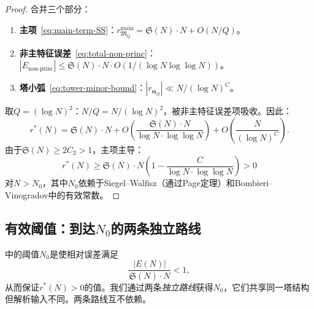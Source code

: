 \documentclass[11pt,a4paper]{article}
\theoremstyle{remark}
\newcommand{\mM}{\mathfrak{M}}
\newcommand{\mm}{\mathfrak{m}}
\begin{document}
\begin{proof}
合并三个部分：
\begin{enumerate}[nosep]
  \item \textbf{主项}~\eqref{eq:main-term-SS}：$r_{\mM_Q}^{\text{main}} = \mathfrak{S}(N)\cdot N + O(N/Q)$。
  \item \textbf{非主特征误差}~\eqref{eq:total-non-princ}：$|E_{\text{non-princ}}| \leq \mathfrak{S}(N)\cdot N \cdot O(1/(\log N\log\log N))$。
  \item \textbf{塔小弧}~\eqref{eq:tower-minor-bound}：$|r_{\mm_Q}| \ll N/(\log N)^C$。
\end{enumerate}

取$Q = (\log N)^2$：$N/Q = N/(\log N)^2$，被非主特征误差项吸收。因此：
\begin{equation}
  r^*(N) = \mathfrak{S}(N)\cdot N + O\!\left(\frac{\mathfrak{S}(N)\cdot N}{\log N\cdot\log\log N}\right)
    + O\!\left(\frac{N}{(\log N)^C}\right).
\end{equation}
由于$\mathfrak{S}(N) \geq 2C_2 > 1$，主项主导：
\begin{equation}
  r^*(N) \geq \mathfrak{S}(N)\cdot N\left(1 - \frac{C}{\log N\cdot\log\log N}\right) > 0
\end{equation}
对$N > N_0$，其中$N_0$依赖于Siegel--Walfisz（通过Page定理）和Bombieri--Vinogradov中的有效常数。
\end{proof}

\subsection{有效阈值：到达$N_0$的两条独立路线}
\label{subsec:threshold}

中的阈值$N_0$是使相对误差满足
\begin{equation}
\label{eq:N0-def}
  \frac{|E(N)|}{\mathfrak{S}(N)\cdot N} < 1,
\end{equation}
从而保证$r^*(N) > 0$的值。我们通过两条\emph{独立路线}获得$N_0$，它们共享同一塔结构但解析输入不同。两条路线互不依赖。
\end{document}
